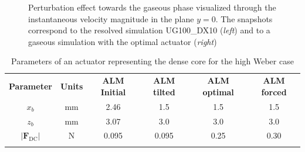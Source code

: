 \clearpage

\begin{figure}[h!]
	\centering	{}
	\caption[Perturbation effect towards the gaseous phase visualized through the instantaneous velocity magnitude in the plane $y = 0$]{Perturbation effect towards the gaseous phase visualized through the instantaneous velocity magnitude in the plane $y = 0$. The snapshots correspond to the resolved simulation UG100\_DX10 (\textsl{left}) and to a gaseous simulation with the optimal actuator (\textsl{right})}	
	\label{fig:u_inst_SPS_and_ALM}
\end{figure}



\begin{table}[!h]
\centering
\caption{Parameters of an actuator representing the dense core for the high Weber case}
\begin{tabular}{cccccc}
\thickhline
\textbf{Parameter} & \textbf{Units} &  \textbf{ALM Initial} & \textbf{ALM tilted} &  \textbf{ALM optimal} & \textbf{ALM forced} \\
\thickhline
$x_b$ & mm & 2.46 & 1.5 & 1.5 & 1.5 \\
$z_b$ & mm & 3.07 & 3.0 & 3.0 & 3.0 \\
$| \textbf{F}_\mathrm{DC} |$ & N & 0.095 & 0.095 & 0.25 & 0.30 \\
\thickhline
\end{tabular}
\label{tab:jicf_lgs_ALM_parameters}
\end{table}




